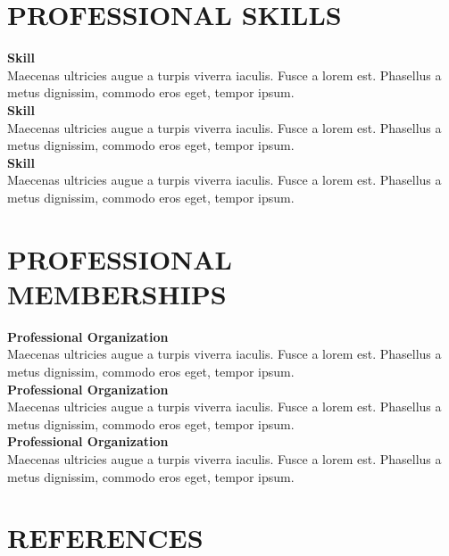 \documentclass[a4paper,9pt]{extarticle}
\begin{document}

\section*{PROFESSIONAL SKILLS}

\noindent
\newline
\textbf{Skill} \\
Maecenas ultricies augue a turpis viverra iaculis. Fusce a lorem est. Phasellus a metus dignissim, commodo eros eget, tempor ipsum.  \\

\noindent
\textbf{Skill} \\
Maecenas ultricies augue a turpis viverra iaculis. Fusce a lorem est. Phasellus a metus dignissim, commodo eros eget, tempor ipsum.  \\

\noindent
\textbf{Skill} \\
Maecenas ultricies augue a turpis viverra iaculis. Fusce a lorem est. Phasellus a metus dignissim, commodo eros eget, tempor ipsum.  


\section*{PROFESSIONAL MEMBERSHIPS}

\noindent
\newline
\textbf{Professional Organization} \\
Maecenas ultricies augue a turpis viverra iaculis. Fusce a lorem est. Phasellus a metus dignissim, commodo eros eget, tempor ipsum.  \\

\noindent
\textbf{Professional Organization} \\
Maecenas ultricies augue a turpis viverra iaculis. Fusce a lorem est. Phasellus a metus dignissim, commodo eros eget, tempor ipsum.  \\

\noindent
\textbf{Professional Organization} \\
Maecenas ultricies augue a turpis viverra iaculis. Fusce a lorem est. Phasellus a metus dignissim, commodo eros eget, tempor ipsum.  


\section*{REFERENCES}
\end{document}
